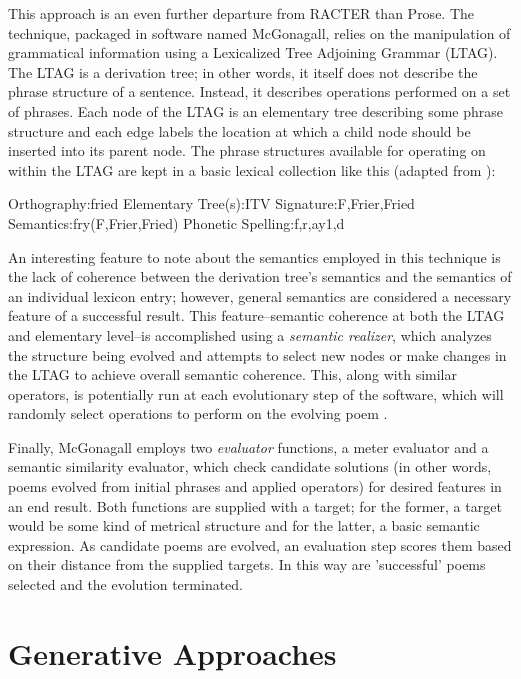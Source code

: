 \documentclass[10pt]{article}
\begin{document}
This approach is an even further departure from RACTER than Prose. The
technique, packaged in software named McGonagall, relies on the manipulation of
grammatical information using a Lexicalized Tree Adjoining Grammar (LTAG). The
LTAG is a derivation tree; in other words, it itself does not describe the
phrase structure of a sentence. Instead, it describes operations performed on a
set of phrases. Each node of the LTAG is an elementary tree describing some
phrase structure and each edge labels the location at which a child node should
be inserted into its parent node. The phrase structures available for operating
on within the LTAG are kept in a basic lexical collection like this (adapted
from \cite{Manurung00}):
\begin{boxedverbatim} 
Orthography:fried
Elementary Tree(s):ITV
Signature:F,Frier,Fried
Semantics:fry(F,Frier,Fried)
Phonetic Spelling:f,r,ay1,d
\end{boxedverbatim}

An interesting feature to note about the semantics employed in
this technique is the lack of coherence between the derivation tree's semantics
and the semantics of an individual lexicon entry; however, general semantics
are considered a necessary feature of a successful result. This
feature--semantic coherence at both the LTAG and elementary level--is
accomplished using a \emph{semantic realizer}, which analyzes the structure
being evolved and attempts to select new nodes or make changes in the LTAG to
achieve overall semantic coherence. This, along with similar operators, is
potentially run at each evolutionary step of the software, which will randomly
select operations to perform on the evolving poem \cite{Manurung00}.

Finally, McGonagall employs two \emph{evaluator} functions, a meter evaluator
and a semantic similarity evaluator, which check candidate solutions (in other
words, poems evolved from initial phrases and applied operators) for desired
features in an end result. Both functions are supplied with a target; for the
former, a target would be some kind of metrical structure and for the latter, a
basic semantic expression. As candidate poems are evolved, an evaluation step
scores them based on their distance from the supplied targets. In this way are
'successful' poems selected and the evolution terminated.

\section{Generative Approaches}
\end{document}
